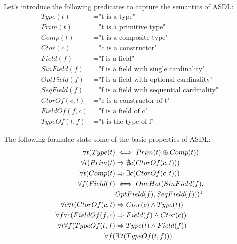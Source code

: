 \iffalse
\noindent
Let's introduce the following predicates to capture the semantics of ASDL:
 \begin{equation}
 \begin{split}
    Type(t) &= \text{"t is a type"} \\
    Prim(t) &= \text{"t is a primitive type"} \\
    Comp(t) &= \text{"t is a composite type"} \\
    Ctor(c) &= \text{"c is a constructor"} \\
    Field(f) &= \text{"f is a field"} \\
    SinField(f) &= \text{"f is a field with single cardinality"} \\
    OptField(f) &= \text{"f is a field with optional cardinality"} \\
    SeqField(f) &= \text{"f is a field with sequential cardinality"} \\
    CtorOf(c, t) &= \text{"c is a constructor of t"} \\
    FieldOf(f, c) &= \text{"f is a field of c"} \\
    TypeOf(t, f) &= \text{"t is the type of f"}
 \end{split}
 \end{equation}

\noindent
The following formulae state some of the basic properties of ASDL:
 \begin{equation}
 \begin{split}
    \forall t(Type(t) &\iff Prim(t) \oplus Comp(t)) \\
    \forall t(Prim(t) &\Rightarrow \nexists c(CtorOf(c, t))) \\
    \forall t(Comp(t) &\Rightarrow \exists c(CtorOf(c, t))) \\
    \forall f(Field(f) &\iff OneHot(SinField(f),\\ 
    & OptField(f), SeqField(f))) \footnotemark \\
    \forall c \forall t(CtorOf(c, t) &\Rightarrow Ctor(c) \land Type(t)) \\
    \forall f \forall c(FieldOf(f, c) &\Rightarrow Field(f) \land Ctor(c)) \\
    \forall t \forall f(TypeOf(t, f) &\Rightarrow Type(t) \land Field(f)) \\
    \forall f(&\exists! t(TypeOf(t, f)))\\
 \end{split}
 \end{equation}

